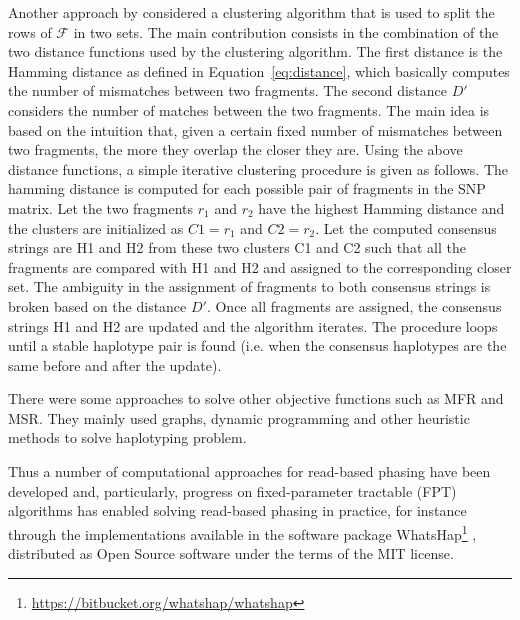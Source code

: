 Another approach by \cite{wang2007clustering} considered a clustering algorithm that is used to split the rows of $\mathcal{F}$ in two sets. 
The main contribution consists in the combination of the two distance functions used by the clustering algorithm. 
The first distance is the Hamming distance as defined in Equation~\ref{eq:distance}, which basically computes the number of mismatches between two fragments. 
The second distance $D'$ considers the number of matches between the two fragments.
The main idea is based on the intuition that, given a certain fixed number of mismatches between two fragments, the more they overlap the closer they are.
Using the above distance functions, a simple iterative clustering procedure is given as follows.
The hamming distance is computed for each possible pair of fragments in the SNP matrix.
Let the two fragments $r_1$ and $r_2$ have the highest Hamming distance and the clusters are initialized as $C1 = r_1$ and $C2 = r_2$.
Let the computed consensus strings are H1 and H2 from these two clusters C1 and C2 such that all the fragments are compared with H1 and H2 and assigned to the corresponding closer set. The ambiguity in the assignment of fragments to both consensus strings is broken based on the distance $D'$.
Once all fragments are assigned, the consensus strings H1 and H2 are updated and the algorithm iterates. The procedure loops until a stable haplotype pair is found (i.e. when the consensus haplotypes are the same before and after the update).

There were some approaches to solve other objective functions such as MFR and MSR.
They mainly used graphs, dynamic programming and other heuristic methods to solve haplotyping problem.

Thus a number of computational approaches for read-based phasing have been developed 
and, particularly, progress on fixed-parameter tractable (FPT) algorithms has enabled solving read-based phasing in practice, for instance through the implementations available in the software package WhatsHap\footnote{\scriptsize{\url{https://bitbucket.org/whatshap/whatshap}}} \citep{martin2016whatshap}, distributed as Open Source software under the terms of the MIT license. 

